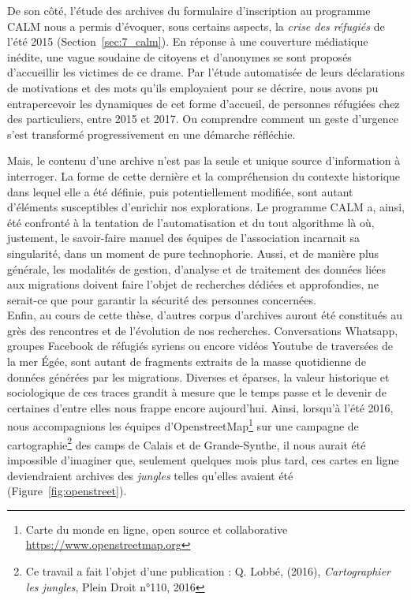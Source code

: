 \documentclass[symmetric,justified,marginals=raggedouter]{tufte-book}
\begin{document}
De son côté, l'étude des archives du formulaire d'inscrip\-tion au programme CALM nous a permis d'évoquer, sous certains aspects, la \textit{crise des réfugiés} de l'été 2015 (Section~\ref{sec:7_calm}). En réponse à une couverture médiatique inédite, une vague soudaine de citoyens et d'anonymes se sont proposés d'accueillir les victimes de ce drame. Par l'étude automatisée de leurs déclarations de motivations et des mots qu'ils employaient pour se décrire, nous avons pu entrapercevoir les dynamiques de cet forme d'accueil, de personnes réfugiées chez des particuliers, entre 2015 et 2017. Ou comprendre comment un geste d'urgence s'est transformé progressivement en une démarche réfléchie. 

Mais, le contenu d'une archive n'est pas la seule et unique source d'information à interroger. La forme de cette dernière et la compréhension du contexte historique dans lequel elle a été définie, puis potentiellement modifiée, sont autant d'éléments susceptibles d'enrichir nos explorations. Le programme CALM a, ainsi, été confronté à la tentation de l'automatisation et du tout algorithme là où, justement, le savoir-faire manuel des équipes de l'association incarnait sa singularité, dans un moment de pure technophorie. Aussi, et de manière plus générale, les modalités de gestion, d'analyse et de traitement des données liées aux migrations doivent faire l'objet de recherches dédiées et approfondies, ne serait-ce que pour garantir la sécurité des personnes concernées. \\

\noindent Enfin, au cours de cette thèse, d'autres corpus d'archives auront été constitués au grès des rencontres et de l'évolution de nos recherches. Conversations Whatsapp, groupes Facebook de réfugiés syriens ou encore vidéos Youtube de traversées de la mer Égée, sont autant de fragments extraits de la masse quotidienne de données générées par les migrations. Diverses et éparses, la valeur historique et sociologique de ces traces grandit à mesure que le temps passe et le devenir de certaines d'entre elles nous frappe encore aujourd'hui. Ainsi, lorsqu'à l'été 2016, nous accompagnions les équipes d'OpenstreetMap\footnote{\RaggedOuter Carte du monde en ligne, open source et collaborative \url{https://www.openstreetmap.org}} sur une campagne de cartographie\footnote{\RaggedOuter Ce travail a fait l'objet d'une publication : Q. Lobbé, (2016), \textit{Cartographier les jungles}, Plein Droit n°110, 2016} des camps de Calais et de Grande-Synthe, il nous aurait été impossible d'imaginer que, seulement quel\-ques mois plus tard, ces cartes en ligne deviendraient archives des \textit{jungles} telles qu'elles avaient été (Figure~\ref{fig:openstreet}). 
\end{document}
